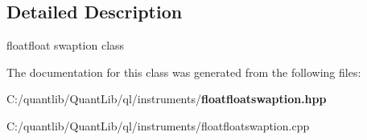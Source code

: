 \subsection{Detailed Description}
floatfloat swaption class 

The documentation for this class was generated from the following files\+:\begin{DoxyCompactItemize}
\item 
C\+:/quantlib/\+Quant\+Lib/ql/instruments/{\bf floatfloatswaption.\+hpp}\item 
C\+:/quantlib/\+Quant\+Lib/ql/instruments/floatfloatswaption.\+cpp\end{DoxyCompactItemize}
